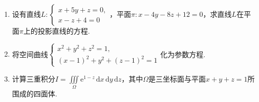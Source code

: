 \documentclass[../main.tex]{subfiles}
\begin{document}
\begin{enumerate}
    \item 设有直线$L:
              \begin{cases}
                  x+5y+z=0, \\
                  x-z+4=0
              \end{cases}$，平面$\pi:x-4y-8z+12=0$，求直线$L$在平面$\pi$上的投影直线的方程.
          \vspace{10em}

    \item 将空间曲线$\begin{cases}
                  x^{2}+y^{2}+z^{2}=1, \\
                  (x-1)^{2}+y^{2}+(z-1)^{2}=1
              \end{cases}$化为参数方程.
          \vspace{10em}

    \item 计算三重积分$I=\iiint\limits_{\Omega}\mathrm{e}^{1-z}\,\mathrm{d}x\,\mathrm{d}
              y\,\mathrm{d}z$，其中$\Omega$是三坐标面与平面$x+y+z=1$所围成的四面体.
          \vspace{10em}
\end{enumerate}
\end{document}
